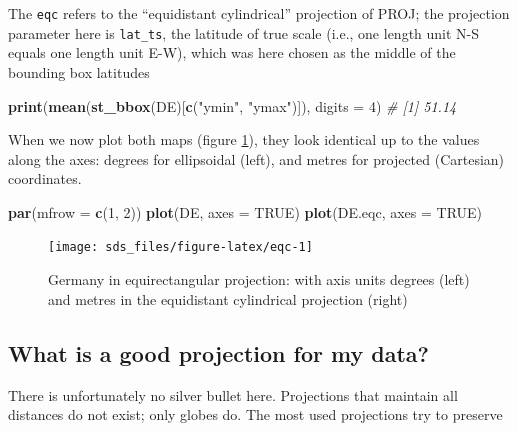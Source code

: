 \documentclass[]{book}
\newenvironment{Shaded}{\begin{snugshade}}{\end{snugshade}}
\newcommand{\CommentTok}[1]{\textcolor[rgb]{0.56,0.35,0.01}{\textit{#1}}}
\newcommand{\DataTypeTok}[1]{\textcolor[rgb]{0.13,0.29,0.53}{#1}}
\newcommand{\DecValTok}[1]{\textcolor[rgb]{0.00,0.00,0.81}{#1}}
\newcommand{\KeywordTok}[1]{\textcolor[rgb]{0.13,0.29,0.53}{\textbf{#1}}}
\newcommand{\NormalTok}[1]{#1}
\newcommand{\OtherTok}[1]{\textcolor[rgb]{0.56,0.35,0.01}{#1}}
\newcommand{\StringTok}[1]{\textcolor[rgb]{0.31,0.60,0.02}{#1}}
\begin{document}
The \texttt{eqc} refers to the ``equidistant cylindrical'' projection of PROJ;
the projection parameter here is \texttt{lat\_ts}, the latitude of true
scale (i.e., one length unit N-S equals one length unit E-W),
which was here chosen as the middle of the bounding box latitudes

\begin{Shaded}
\begin{Highlighting}[]
\KeywordTok{print}\NormalTok{(}\KeywordTok{mean}\NormalTok{(}\KeywordTok{st_bbox}\NormalTok{(DE)[}\KeywordTok{c}\NormalTok{(}\StringTok{"ymin"}\NormalTok{, }\StringTok{"ymax"}\NormalTok{)]), }\DataTypeTok{digits =} \DecValTok{4}\NormalTok{)}
\CommentTok{# [1] 51.14}
\end{Highlighting}
\end{Shaded}

When we now plot both maps (figure \ref{fig:eqc}), they look
identical up to the values along the axes: degrees for ellipsoidal
(left), and metres for projected (Cartesian) coordinates.

\begin{Shaded}
\begin{Highlighting}[]
\KeywordTok{par}\NormalTok{(}\DataTypeTok{mfrow =} \KeywordTok{c}\NormalTok{(}\DecValTok{1}\NormalTok{, }\DecValTok{2}\NormalTok{))}
\KeywordTok{plot}\NormalTok{(DE, }\DataTypeTok{axes =} \OtherTok{TRUE}\NormalTok{)}
\KeywordTok{plot}\NormalTok{(DE.eqc, }\DataTypeTok{axes =} \OtherTok{TRUE}\NormalTok{)}
\end{Highlighting}
\end{Shaded}

\begin{figure}

{\centering \texttt{[image: sds\_files/figure-latex/eqc-1]} 

}

\caption{Germany in equirectangular projection: with axis units degrees (left) and metres in the equidistant cylindrical projection (right)}\label{fig:eqc}
\end{figure}

\hypertarget{what-is-a-good-projection-for-my-data}{%
\subsection{What is a good projection for my data?}\label{what-is-a-good-projection-for-my-data}}

There is unfortunately no silver bullet here. Projections that
maintain all distances do not exist; only globes do. The most
used projections try to preserve
\end{document}
